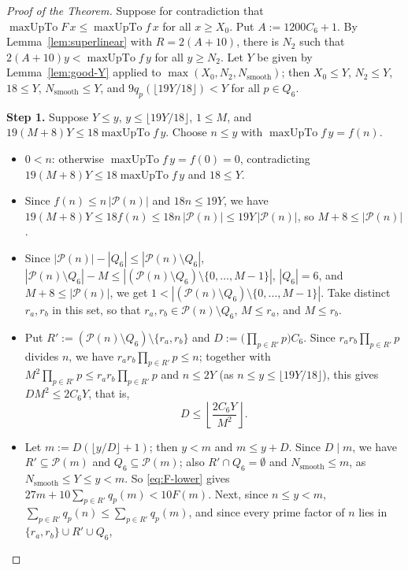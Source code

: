 \documentclass[11pt,a4paper]{amsart}
\newcommand{\maxUpTo}{\operatorname{maxUpTo}}
\newcommand{\Nsmooth}{N_{\mathrm{smooth}}}
\begin{document}
\begin{proof}[Proof of the Theorem]
Suppose for contradiction that $\maxUpTo F\, x \le \maxUpTo f\, x$ for all $x \ge X_0$. Put $A := 1200 C_6 + 1$. By Lemma~\ref{lem:superlinear} with $R = 2(A + 10)$, there is $N_2$ such that $2(A + 10) y < \maxUpTo f\, y$ for all $y \ge N_2$. Let $Y$ be given by Lemma~\ref{lem:good-Y} applied to $\max(X_0, N_2, \Nsmooth)$; then $X_0 \le Y$, $N_2 \le Y$, $18 \le Y$, $\Nsmooth \le Y$, and $9 q_p(\lfloor 19 Y / 18 \rfloor) < Y$ for all $p \in Q_6$.

\medskip\noindent\textbf{Step 1.}
Suppose $Y \le y$, $y \le \lfloor 19 Y / 18 \rfloor$, $1 \le M$, and $19 (M + 8) Y \le 18 \maxUpTo f\, y$. Choose $n \le y$ with $\maxUpTo f\, y = f(n)$.
\begin{itemize}
\item $0 < n$: otherwise $\maxUpTo f\, y = f(0) = 0$, contradicting $19 (M + 8) Y \le 18 \maxUpTo f\, y$ and $18 \le Y$.
\item Since $f(n) \le n \, |\mathcal{P}(n)|$ and $18 n \le 19 Y$, we have $19(M + 8) Y \le 18 f(n) \le 18 n \, |\mathcal{P}(n)| \le 19 Y \, |\mathcal{P}(n)|$, so $M + 8 \le |\mathcal{P}(n)|$.
\item Since $|\mathcal{P}(n)| - |Q_6| \le |\mathcal{P}(n) \setminus Q_6|$, $|\mathcal{P}(n) \setminus Q_6| - M \le |(\mathcal{P}(n) \setminus Q_6) \setminus \{0, \dots, M - 1\}|$, $|Q_6| = 6$, and $M + 8 \le |\mathcal{P}(n)|$, we get $1 < |(\mathcal{P}(n) \setminus Q_6) \setminus \{0, \dots, M - 1\}|$. Take distinct $r_a, r_b$ in this set, so that $r_a, r_b \in \mathcal{P}(n) \setminus Q_6$, $M \le r_a$, and $M \le r_b$.
\item Put $R' := (\mathcal{P}(n) \setminus Q_6) \setminus \{r_a, r_b\}$ and $D := \bigl(\prod_{p \in R'} p\bigr) C_6$. Since $r_a r_b \prod_{p \in R'} p$ divides $n$, we have $r_a r_b \prod_{p \in R'} p \le n$; together with $M^2 \prod_{p \in R'} p \le r_a r_b \prod_{p \in R'} p$ and $n \le 2Y$ (as $n \le y \le \lfloor 19 Y / 18 \rfloor$), this gives $D M^2 \le 2 C_6 Y$, that is,
\[
D \le \left\lfloor \frac{2 C_6 Y}{M^2} \right\rfloor.
\]
\item Let $m := D(\lfloor y / D \rfloor + 1)$; then $y < m$ and $m \le y + D$. Since $D \mid m$, we have $R' \subseteq \mathcal{P}(m)$ and $Q_6 \subseteq \mathcal{P}(m)$; also $R' \cap Q_6 = \emptyset$ and $\Nsmooth \le m$, as $\Nsmooth \le Y \le y < m$. So \eqref{eq:F-lower} gives $27 m + 10 \sum_{p \in R'} q_p(m) < 10 F(m)$. Next, since $n \le y < m$, $\sum_{p \in R'} q_p(n) \le \sum_{p \in R'} q_p(m)$, and since every prime factor of $n$ lies in $\{r_a, r_b\} \cup R' \cup Q_6$,

\end{itemize}
\end{proof}
\end{document}
